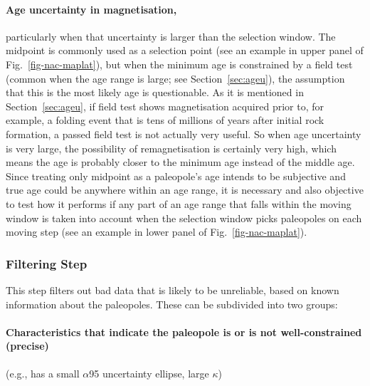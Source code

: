 \paragraph{Age uncertainty in magnetisation,}
particularly when that uncertainty is larger than the selection window. The
midpoint is commonly used as a selection point (see an example in upper panel
of Fig.~\ref{fig-nac-maplat}), but when the minimum age is constrained by a
field test (common when the age range is large; see Section~\ref{sec:ageu}), the
assumption that this is the most likely age is questionable. As it is mentioned
in Section~\ref{sec:ageu}, if field test shows magnetisation acquired prior to,
for example, a folding event that is tens of millions of years after initial
rock formation, a passed field test is not actually very useful. So when age
uncertainty is very large, the possibility of remagnetisation is certainly very
high, which means the age is probably closer to the minimum age instead of the
middle age. Since treating only midpoint as a paleopole's age intends to be
subjective and true age could be anywhere within an age range, it is necessary
and also objective to test how it performs if any part of an age range that
falls within the moving window is taken into account when the selection window
picks paleopoles on each moving step (see an example in lower panel of
Fig.~\ref{fig-nac-maplat}).

\subsubsection{Filtering Step}

This step filters out bad data that is likely to be unreliable, based on known
information about the paleopoles. These can be subdivided into two groups:

\paragraph{Characteristics that indicate the paleopole is or is not
well-constrained (precise)}
(e.g., has a small $\alpha$95 uncertainty ellipse, large $\kappa$)

